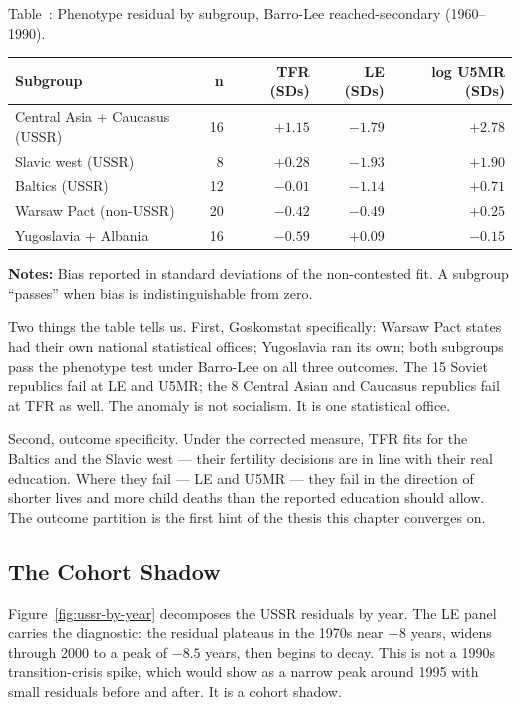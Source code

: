 \documentclass[12pt,letterpaper]{article}
\begin{document}
\label{tab:subgroup-bias}Table~\thetable: Phenotype residual by subgroup, Barro-Lee reached-secondary (1960--1990).

{\setlength{\tabcolsep}{4pt}
\begin{longtable}[]{@{}lrrrr@{}}
\toprule
Subgroup & n & TFR (SDs) & LE (SDs) & log U5MR (SDs) \\
\midrule
\endhead
Central Asia + Caucasus (USSR) & 16 & $+1.15$ & $-1.79$ & $+2.78$ \\
Slavic west (USSR) & 8 & $+0.28$ & $-1.93$ & $+1.90$ \\
Baltics (USSR) & 12 & $-0.01$ & $-1.14$ & $+0.71$ \\
Warsaw Pact (non-USSR) & 20 & $-0.42$ & $-0.49$ & $+0.25$ \\
Yugoslavia + Albania & 16 & $-0.59$ & $+0.09$ & $-0.15$ \\
\bottomrule
\end{longtable}}

\begin{minipage}{\dimexpr\textwidth-2em}
\scriptsize
\textbf{Notes:} Bias reported in standard deviations of the
non-contested fit. A subgroup ``passes'' when bias is
indistinguishable from zero.
\end{minipage}

Two things the table tells us. First, Goskomstat specifically:
Warsaw Pact states had their own national statistical offices;
Yugoslavia ran its own; both subgroups pass the phenotype test
under Barro-Lee on all three outcomes. The 15 Soviet republics fail
at LE and U5MR; the 8 Central Asian and Caucasus republics fail at
TFR as well. The anomaly is not socialism. It is one statistical
office.

Second, outcome specificity. Under the corrected measure, TFR fits
for the Baltics and the Slavic west --- their fertility decisions
are in line with their real education. Where they fail --- LE and
U5MR --- they fail in the direction of shorter lives and more child
deaths than the reported education should allow. The outcome
partition is the first hint of the thesis this chapter converges
on.

\subsection{The Cohort Shadow}\label{cohort-shadow}

Figure~\ref{fig:ussr-by-year} decomposes the USSR residuals by year.
The LE panel carries the diagnostic: the residual plateaus in the
1970s near $-8$ years, widens through 2000 to a peak of $-8.5$
years, then begins to decay. This is not a 1990s transition-crisis
spike, which would show as a narrow peak around 1995 with small
residuals before and after. It is a cohort shadow.
\end{document}

